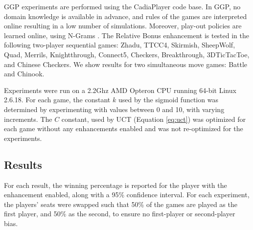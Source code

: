 \documentclass{ecai2014}
\begin{document}
GGP experiments are performed using the {\sc CadiaPlayer} code base. In GGP, no domain knowledge is available in advance, and rules of the games are interpreted online resulting in a low number of simulations. Moreover, play-out policies are learned online, using N-Grams \cite{Tak2012}. The Relative Bonus enhancement is tested in the following two-player sequential games: Zhadu, TTCC4, Skirmish, SheepWolf, Quad, Merrils, Knightthrough, Connect5, Checkers, Breakthrough, 3DTicTacToe, and Chinese Checkers. We show results for two simultaneous move games: Battle and Chinook.

Experiments were run on a 2.2Ghz AMD Opteron CPU running 64-bit Linux 2.6.18. For each game, the constant $k$ used by the sigmoid function was determined by experimenting with values between 0 and 10, with varying increments. The $C$ constant, used by UCT (Equation \ref{eq:uct}) was optimized for each game without any enhancements enabled and was not re-optimized for the experiments.
\subsection{Results}
\label{subsec:results}
For each result, the winning percentage is reported for the player with the enhancement enabled, along with a 95\% confidence interval. For each experiment, the players' seats were swapped such that 50\% of the games are played as the first player, and 50\% as the second, to ensure no first-player or second-player bias.
\end{document}
